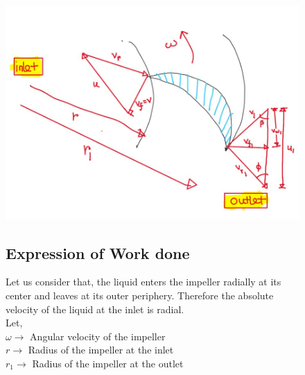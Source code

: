 \documentclass{article}
\begin{document}
\begin{figure}[H]
  \begin{center}
    \includegraphics[width = \columnwidth]{img/centrifugal_work_done.jpg}
  \end{center}
  
  \begin{multicols}{2}
    \subsection*{Expression of Work done}
    Let us consider that, the liquid enters the impeller radially at its center and leaves at its outer periphery. Therefore the absolute velocity of the liquid at the inlet is radial. \\
    Let,\\
    $\omega \rightarrow$ Angular velocity of the impeller \\
    $r \rightarrow$ Radius of the impeller at the inlet \\ 
    $r_1 \rightarrow$ Radius of the impeller at the outlet \\ 
    \end{multicols}
  \end{figure}
\end{document}
